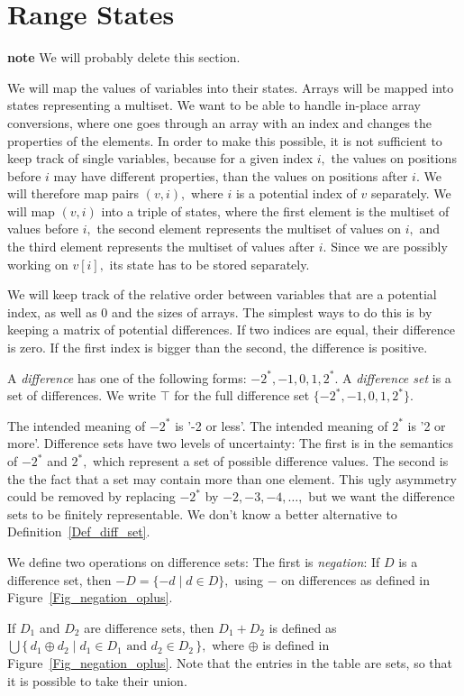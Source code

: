
\section{Range States}
\label{Sect_range_states}

{\bf note} We will probably delete this section.

We will map the values of variables into their states.
Arrays will be mapped into states representing a multiset. 
We want to be able to handle in-place array conversions, where
one goes through an array with an index
and changes the properties of the elements.
In order to make this possible, it is not sufficient to 
keep track of single variables, because for a given index $ i, $ 
the values on positions before $ i $ may have different properties,
than the values on positions after $ i. $ 
We will therefore map pairs $ ( v, i ), $ where $ i $ is a potential
index of $ v $ separately. We will map $ (v,i) $ into a triple
of states, where the first element is the multiset of values before $ i, $ 
the second element represents the multiset of values on $ i, $
and the third element represents the multiset of values after $ i. $ 
Since we are possibly working on $ v[i], $ its state has to be stored
separately.

We will keep track of the
relative order between variables that are a potential index,
as well as $ 0 $ and the sizes of arrays.
The simplest ways to do this is by keeping a matrix of potential
differences.
If two indices are equal, their difference is zero.
If the first index is bigger than the second, the difference is positive.
\begin{definition}
   \label{Def_diff_set}
   A \emph{difference} has one of the following forms:
   $ -2^{*}, -1, 0, 1, 2^{*}. $
   A \emph{difference set} is a set of differences.
   We write $ \top $ for the full difference set
   $ \{ -2^{*}, -1, 0, 1, 2^{*} \}. $
\end{definition}
The intended meaning of $ -2^{*} $ is '-2 or less'.
The intended meaning of $ 2^{*} $ is '2 or more'.
Difference sets have two levels of uncertainty:
The first is in the semantics of $ -2^{*} $ and $ 2^{*}, $
which represent a set of possible difference values.
The second is the the fact that a set may contain more than one
element. This ugly asymmetry could be removed by replacing
$ -2^{*} $ by $ -2,-3,-4, \ldots, $ but we want the difference
sets to be finitely representable. We don't know a better
alternative to Definition~\ref{Def_diff_set}.

\begin{definition}
   We define two operations on difference sets:
   The first is \emph{negation}:
   If $ D $ is a difference set, then
   $ -D = \{ -d \mid d \in D \}, $
   using $ - $ on differences as defined in Figure~\ref{Fig_negation_oplus}.

   If $ D_1 $ and $ D_2 $ are difference sets, then
   $ D_1 + D_2 $ is defined as
   $ \bigcup \{ \, d_1 \oplus d_2 \mid
                   d_1 \in D_1 \mbox{ and } d_2 \in D_2 \, \}, $
   where $ \oplus $ is defined in Figure~\ref{Fig_negation_oplus}.
   Note that the entries in the table are sets, so that it is possible
   to take their union.
\end{definition}

